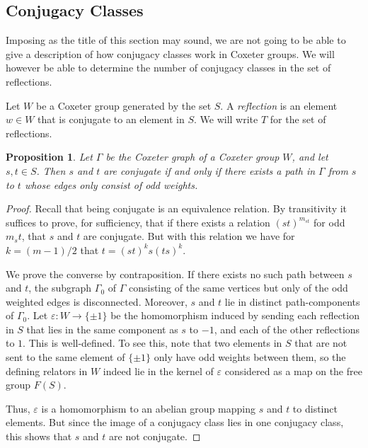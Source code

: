\documentclass{article}
\newtheorem{proposition}[theorem]{Proposition}
\theoremstyle{definition}
\begin{document}
\subsection{Conjugacy Classes}\label{subsec:conjugacy-classes}
Imposing as the title of this section may sound, we are not going to be able to give a description of how conjugacy classes work in Coxeter groups. We will however be able to determine the number of conjugacy classes in the set of reflections.

Let $W$ be a Coxeter group generated by the set $S$. A \textit{reflection} is an element $w \in W$ that is conjugate to an element in $S$. We will write $T$ for the set of reflections.

\begin{proposition}\label{prop:conjugacy}
Let $\Gamma$ be the Coxeter graph of a Coxeter group $W$, and let $s, t \in S$. Then $s$ and $t$ are conjugate if and only if there exists a path in $\Gamma$ from $s$ to $t$ whose edges only consist of odd weights.
\end{proposition}

\begin{proof}
Recall that being conjugate is an equivalence relation. By transitivity it suffices to prove, for sufficiency, that if there exists a relation $(st)^{m_{st}}$ for odd $m_st$, that $s$ and $t$ are conjugate. But with this relation we have for $k = (m-1)/2$ that $t = (st)^ks(ts)^k$.

We prove the converse by contraposition. If there exists no such path between $s$ and $t$, the subgraph $\Gamma_0$ of $\Gamma$ consisting of the same vertices but only of the odd weighted edges is disconnected. Moreover, $s$ and $t$ lie in distinct path-components of $\Gamma_0$. Let $\varepsilon: W \rightarrow \{\pm1\}$ be the homomorphism induced by sending each reflection in $S$ that lies in the same component as $s$ to $-1$, and each of the other reflections to $1$. This is well-defined. To see this, note that two elements in $S$ that are not sent to the same element of $\{\pm1\}$ only have odd weights between them, so the defining relators in $W$ indeed lie in the kernel of $\varepsilon$ considered as a map on the free group $F(S)$.

Thus, $\varepsilon$ is a homomorphism to an abelian group mapping $s$ and $t$ to distinct elements. But since the image of a conjugacy class lies in one conjugacy class, this shows that $s$ and $t$ are not conjugate.
\end{proof}
\end{document}
